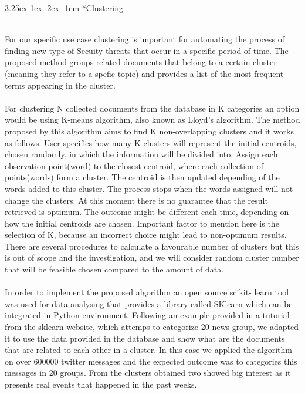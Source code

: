 \documentclass[12pt]{article}
\makeatletter
\renewcommand\paragraph{\@startsection{paragraph}{5}{\z@}%
  {3.25ex \@plus1ex \@minus.2ex}%
  {-1em}%
  {\normalfont\normalsize\bfseries}}
\makeatother
\begin{document}
\paragraph*{Clustering}
\hfill \break 
\\
For our specific use case clustering is important for automating the process of finding new type of Secuity threats that occur in a specific period of time. The proposed method groups related documents that belong to a certain cluster (meaning they refer to a spefic topic) and provides a list of the most frequent terms appearing in the cluster.
\\
\\
For clustering N collected documents from the database in K categories an option would be using K-means\cite{k-means} algorithm, also known as Lloyd's algorithm. The method\cite{k-means-example} proposed by this algorithm aims to find K non-overlapping clusters and it works as follows. User specifies how many K clusters will represent the initial centroids, chosen randomly, in which the information will be divided into. Assign each observation point(word) to the closest centroid, where each collection of points(words) form a cluster. The centroid is then updated depending of the words added to this cluster. The process stops when the words assigned will not change the clusters. At this moment there is no guarantee that the result retrieved is optimum. The outcome might be different each time, depending on how the initial centroids are chosen. Important factor to mention here is the selection of K, because an incorrect choice might lead to non-optimum results. There are several procedures\cite{procedures-for-kmeans} to calculate a favourable number of clusters but this is out of scope and the investigation, and we will consider random cluster number that will be feasible chosen compared to the amount of data.
\\
\\
In order to implement the proposed algorithm an open  source scikit- learn \cite{sklearn} tool was used for data analysing that provides a library called SKlearn which can be integrated in Python environment. Following an example provided in a tutorial from the sklearn website, which attemps to categorize 20 news group\cite{k-means-20news}, we adapted it to use the data provided in the database and show what are the documents that are related to each other in a cluster.  In this case we applied the algorithm on over 600000 twitter messages and the expected outcome was to categories this messages in 20 groups. From the clusters obtained two showed big interest as it presents real events that happened in the past weeks.
\end{document}
